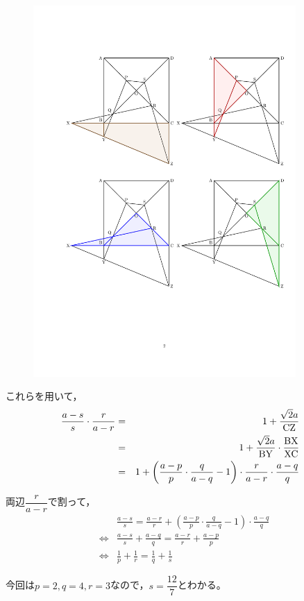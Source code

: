 \documentclass[a4paper,12pt,uplatex]{jsarticle}  %
\begin{document}
\begin{enumerate}
\begin{figure}[ht]
  \centering
  \includegraphics[width=10.0cm]{jizen_4_2_solution.pdf}
\end{figure}

これらを用いて，
\begin{eqnarray*}
\frac{a-s}{s}\cdot\frac{r}{a-r} &=& 1+\frac{\sqrt 2 a}{{\rm CZ}} \\
&=& 1+\frac{\sqrt 2 a}{{\rm BY}} \cdot \frac{{\rm BX}}{{\rm XC}} \\
&=& 1+ \left(\frac{a-p}{p}\cdot\frac{q}{a-q}-1\right)\cdot \frac{r}{a-r}\cdot\frac{a-q}{q}
\end{eqnarray*}

両辺$\dfrac{r}{a-r}$で割って，
\begin{eqnarray*}
&&\frac{a-s}{s} = \frac{a-r}{r}+ \left(\frac{a-p}{p}\cdot\frac{q}{a-q}-1\right)\cdot\frac{a-q}{q} \\
&\Leftrightarrow& \frac{a-s}{s} + \frac{a-q}{q} = \frac{a-r}{r} + \frac{a-p}{p}\\
&\Leftrightarrow& \frac{1}{p}+\frac{1}{r} = \frac{1}{q}+\frac{1}{s}
\end{eqnarray*}

今回は$p=2,q=4,r=3$なので，$s=\dfrac{12}{7}$とわかる。

\bigskip


\end{enumerate}
\end{document}
